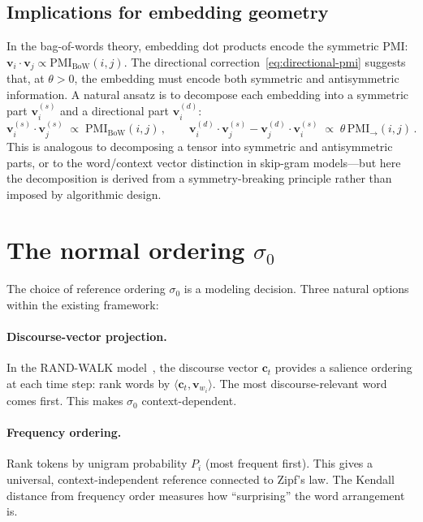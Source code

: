 \documentclass[11pt]{article}
\newcommand{\vw}{\bm{v}}
\newcommand{\PMI}{\mathrm{PMI}}
\newcommand{\BoW}{\mathrm{BoW}}
\begin{document}
\subsection{Implications for embedding geometry}

In the bag-of-words theory, embedding dot products encode the symmetric PMI: $\vw_i \cdot \vw_j \propto \PMI_{\BoW}(i,j)$. The directional correction~\eqref{eq:directional-pmi} suggests that, at $\theta > 0$, the embedding must encode both symmetric and antisymmetric information. A natural ansatz is to decompose each embedding into a symmetric part $\vw_i^{(s)}$ and a directional part $\vw_i^{(d)}$:
\begin{equation}\label{eq:embedding-decomposition}
    \vw_i^{(s)} \cdot \vw_j^{(s)} \;\propto\; \PMI_{\BoW}(i,j)\,, \qquad \vw_i^{(d)} \cdot \vw_j^{(s)} - \vw_j^{(d)} \cdot \vw_i^{(s)} \;\propto\; \theta\, \PMI_{\to}(i,j)\,.
\end{equation}
This is analogous to decomposing a tensor into symmetric and antisymmetric parts, or to the word/context vector distinction in skip-gram models---but here the decomposition is derived from a symmetry-breaking principle rather than imposed by algorithmic design.

\section{The normal ordering $\sigma_0$}

The choice of reference ordering $\sigma_0$ is a modeling decision. Three natural options within the existing framework:

\paragraph{Discourse-vector projection.} In the RAND-WALK model~\cite{arora2016}, the discourse vector $\bm{c}_t$ provides a salience ordering at each time step: rank words by $\langle \bm{c}_t, \vw_{w_i} \rangle$. The most discourse-relevant word comes first. This makes $\sigma_0$ context-dependent.

\paragraph{Frequency ordering.} Rank tokens by unigram probability $P_i$ (most frequent first). This gives a universal, context-independent reference connected to Zipf's law. The Kendall distance from frequency order measures how ``surprising'' the word arrangement is.
\end{document}
